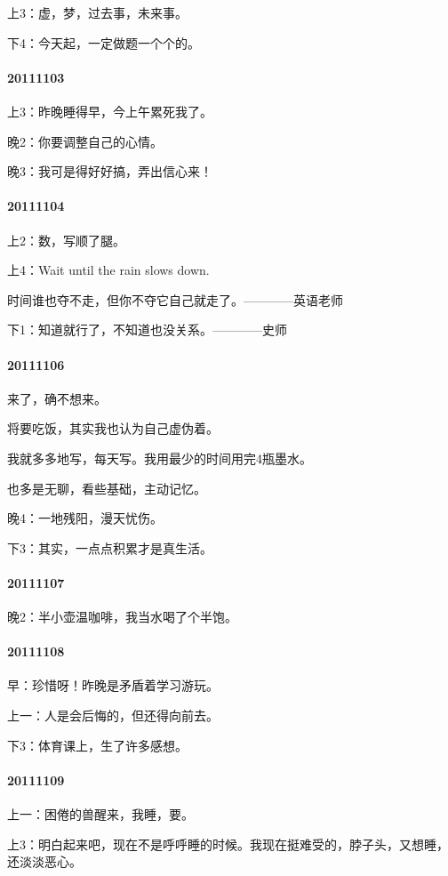 \documentclass[UTF8]{book}
\begin{document}
上3：虚，梦，过去事，未来事。

下4：今天起，一定做题一个个的。


\paragraph{20111103}
上3：昨晚睡得早，今上午累死我了。

晚2：你要调整自己的心情。

晚3：我可是得好好搞，弄出信心来！


\paragraph{20111104}
上2：数，写顺了腿。

上4：Wait until the rain slows down.

时间谁也夺不走，但你不夺它自己就走了。————英语老师

下1：知道就行了，不知道也没关系。————史师


\paragraph{20111106}
来了，确不想来。

将要吃饭，其实我也认为自己虚伪着。

我就多多地写，每天写。我用最少的时间用完4瓶墨水。

也多是无聊，看些基础，主动记忆。

晚4：一地残阳，漫天忧伤。

下3：其实，一点点积累才是真生活。


\paragraph{20111107}
晚2：半小壶温咖啡，我当水喝了个半饱。


\paragraph{20111108}
早：珍惜呀！昨晚是矛盾着学习游玩。

上一：人是会后悔的，但还得向前去。

下3：体育课上，生了许多感想。


\paragraph{20111109}
上一：困倦的兽醒来，我睡，要。

上3：明白起来吧，现在不是呼呼睡的时候。我现在挺难受的，脖子头，又想睡，还淡淡恶心。
\end{document}

